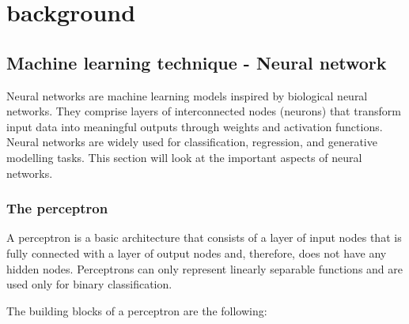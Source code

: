 \section{background}




	
	
	\subsection{Machine learning technique - Neural network}

		
		Neural networks are machine learning models inspired by biological neural networks. They comprise layers of interconnected nodes (neurons) that transform input data into meaningful outputs through weights and activation functions. Neural networks are widely used for classification, regression, and generative modelling tasks. This section will look at the important aspects of neural networks.
		
		
		\bigskip
		\subsubsection{The perceptron}
				
		A perceptron is a basic architecture that consists of a layer of input nodes that is fully connected with a layer of output nodes and, therefore, does not have any hidden nodes. Perceptrons can only represent linearly separable functions and are used only for binary classification.
		
		The building blocks of a perceptron are the following:
		

